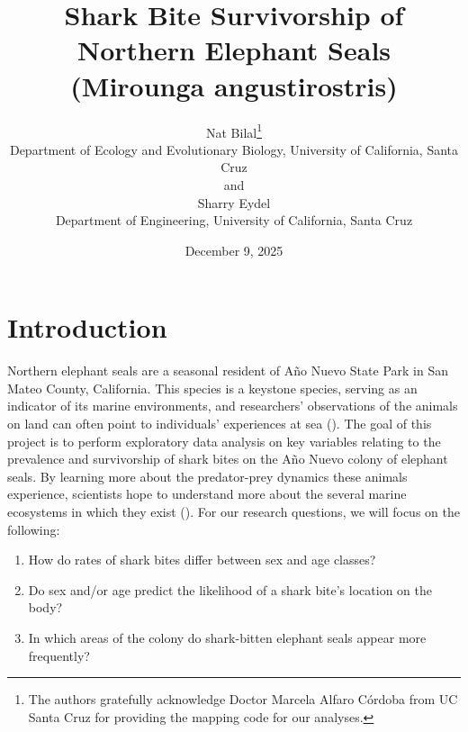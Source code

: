 \documentclass[
  12pt]{article}
\begin{document}
\def\spacingset#1{\renewcommand{\baselinestretch}%
{#1}\small\normalsize} \spacingset{1}



\date{December 9, 2025}
\title{\bf Shark Bite Survivorship of Northern Elephant Seals (Mirounga
angustirostris)}
\author{
Nat Bilal\thanks{The authors gratefully acknowledge Doctor Marcela
Alfaro Córdoba from UC Santa Cruz for providing the mapping code for our
analyses.}\\
Department of Ecology and Evolutionary Biology, University of
California, Santa Cruz\\
and\\Sharry Eydel\\
Department of Engineering, University of California, Santa Cruz\\
}
\maketitle

\bigskip
\bigskip
\begin{abstract}

\end{abstract}


\newpage
\spacingset{1.9} %


\section{Introduction}\label{sec-intro}

Northern elephant seals are a seasonal resident of Año Nuevo State Park
in San Mateo County, California. This species is a keystone species,
serving as an indicator of its marine environments, and researchers'
observations of the animals on land can often point to individuals'
experiences at sea (\citet{beltran2025}). The goal of this project is to
perform exploratory data analysis on key variables relating to the
prevalence and survivorship of shark bites on the Año Nuevo colony of
elephant seals. By learning more about the predator-prey dynamics these
animals experience, scientists hope to understand more about the several
marine ecosystems in which they exist (\citet{andrzejaczek2022}). For
our research questions, we will focus on the following:

\begin{enumerate}
\def\labelenumi{\arabic{enumi}.}
\item
  How do rates of shark bites differ between sex and age classes?
\item
  Do sex and/or age predict the likelihood of a shark bite's location on
  the body?
\item
  In which areas of the colony do shark-bitten elephant seals appear
  more frequently?
\end{enumerate}
\end{document}
